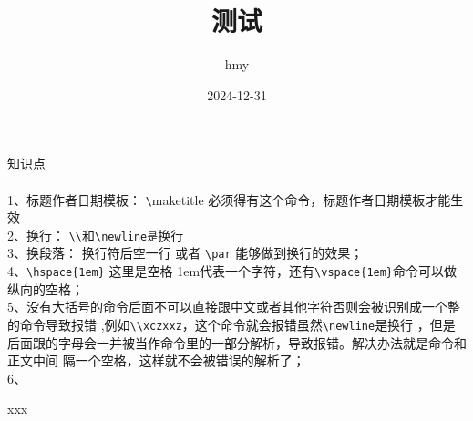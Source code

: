 \documentclass[a4paper]{article} %
\title{测试}
\author{hmy}
\date{2024-12-31}
\begin{document}
\maketitle 

\newpage
知识点\\
\\
1、标题作者日期模板： \verb|\|maketitle 必须得有这个命令，标题作者日期模板才能生效\\
2、换行： \verb|\\|和\verb|\newline是|换行\\
3、换段落： 换行符后空一行 或者 \verb|\par| 能够做到换行的效果；\\
4、\verb|\hspace{1em}| 这里是空格 1em代表一个字符，还有\verb|\vspace{1em}|命令可以做纵向的空格；\\
5、没有大括号的命令后面不可以直接跟中文或者其他字符否则会被识别成一个整的命令导致报错
,例如\verb|\\xczxxz|，这个命令就会报错虽然\verb|\newline|是换行
，但是后面跟的字母会一并被当作命令里的一部分解析，导致报错。解决办法就是命令和正文中间
隔一个空格，这样就不会被错误的解析了；\\
6、

\newpage
xxx
\end{document}
